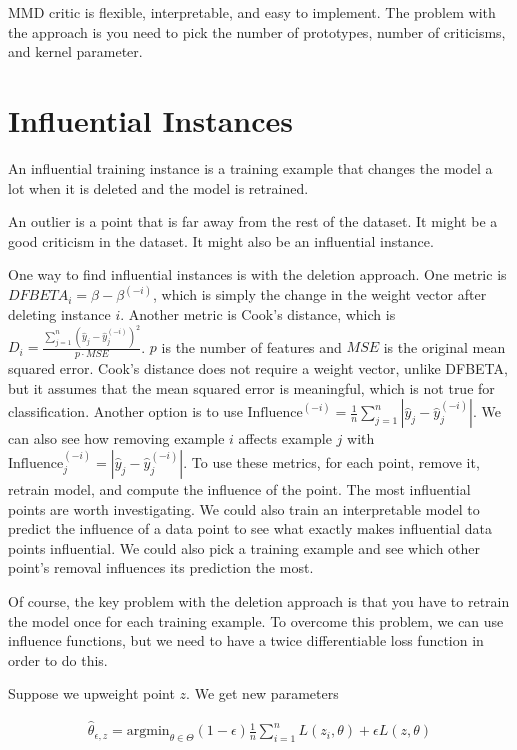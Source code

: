 \documentclass[a4paper]{article}
\begin{document}
MMD critic is flexible, interpretable, and easy to implement. The problem with
the approach is you need to pick the number of prototypes, number of criticisms,
and kernel parameter.

\section{Influential Instances}
An influential training instance is a training example that changes the model a
lot when it is deleted and the model is retrained.

An outlier is a point that is far away from the rest of the dataset. It might
be a good criticism in the dataset. It might also be an influential instance.

One way to find influential instances is with the deletion approach. One
metric is $DFBETA_i = \beta - \beta^{(-i)}$, which is simply the change in the
weight vector after deleting instance $i$. Another metric is Cook's distance,
which is $D_i = \frac{\sum_{j=1}^{n}{(\hat{y}_j - \hat{y}_j^{(-i)})^2}}{p \cdot
MSE}$. $p$ is the number of features and $MSE$ is the original mean squared
error. Cook's distance does not require a weight vector, unlike DFBETA, but it
assumes that the mean squared error is meaningful, which is not true for
classification. Another option is to use $\textrm{Influence}^{(-i)} =
\frac{1}{n} \sum_{j=1}^{n}{|\hat{y}_j - \hat{y}_j^{(-i)}|}$. We can also see
how removing example $i$ affects example $j$ with $\textrm{Influence}^{(-i)}_j =
|\hat{y}_j - \hat{y}_j^{(-i)}|$. To use these metrics, for each point, remove it,
retrain model, and compute the influence of the point. The most influential
points are worth investigating. We could also train an interpretable model to
predict the influence of a data point to see what exactly makes influential
data points influential. We could also pick a training example and see which
other point's removal influences its prediction the most.

Of course, the key problem with the deletion approach is that you have to
retrain the model once for each training example. To overcome this problem,
we can use influence functions, but we need to have a twice differentiable
loss function in order to do this.

Suppose we upweight point $z$. We get new parameters

\begin{align}
  \hat{\theta}_{\epsilon, z} = \textrm{argmin}_{\theta \in \Theta}{
  (1 - \epsilon) \frac{1}{n} \sum_{i=1}^{n}{L(z_i, \theta)}
  + \epsilon L(z, \theta)
  }
\end{align}
\end{document}

